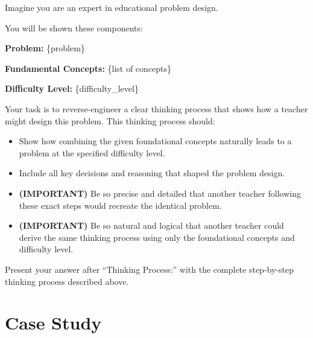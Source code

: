   \begin{tcolorbox}[colback=blue!5!white, colframe=blue!75!black, title=Rationale Generation Instruction]
  Imagine you are an expert in educational problem design.
  
  You will be shown these components:
  
  \textbf{Problem:} \{problem\}
  
  \textbf{Fundamental Concepts:} \{list of concepts\}
  
  \textbf{Difficulty Level:} \{difficulty\_level\}
  
  Your task is to reverse-engineer a clear thinking process that shows how a teacher might design this problem. This thinking process should:
  \begin{itemize}
      \item Show how combining the given foundational concepts naturally leads to a problem at the specified difficulty level.
      \item Include all key decisions and reasoning that shaped the problem design.
      \item \textbf{(IMPORTANT)} Be so precise and detailed that another teacher following these exact steps would recreate the identical problem.
      \item \textbf{(IMPORTANT)} Be so natural and logical that another teacher could derive the same thinking process using only the foundational concepts and difficulty level.
  \end{itemize}
  
  Present your answer after ``Thinking Process:'' with the complete step-by-step thinking process described above.
  \end{tcolorbox}
  
  
  \section{Case Study}
  
  
  
